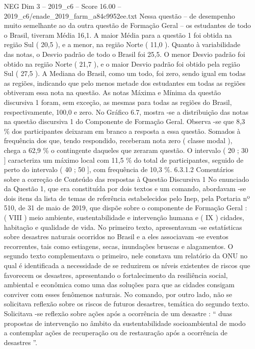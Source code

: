 \begin{textsample}{NEG Dim 3 – 2019\_c6 – Score 16.00 – 2019\_c6/enade\_2019\_farm\_a84c9952ee.txt}
Nessa questão – de desempenho muito semelhante ao da outra questão de Formação Geral – os estudantes de todo o Brasil, tiveram Média 16,1.
A maior Média para a questão 1 foi obtida na região Sul ( 20,5 ), e a menor, na região Norte ( 11,0 ).
Quanto à variabilidade das notas, o Desvio padrão de todo o Brasil foi 25,5.
O menor Desvio padrão foi obtido na região Norte ( 21,7 ), e o maior Desvio padrão foi obtido pela região Sul ( 27,5 ).
A Mediana do Brasil, como um todo, foi zero, sendo igual em todas as regiões, indicando que pelo menos metade dos estudantes em todas as regiões obtiveram essa nota na questão.
As notas Máxima e Mínima da questão discursiva 1 foram, sem exceção, as mesmas para todas as regiões do Brasil, respectivamente, 100,0 e zero.
No Gráfico 6.7, mostra -se a distribuição das notas na questão discursiva 1 do Componente de Formação Geral.
Observa -se que 8,3 \% dos participantes deixaram em branco a resposta a essa questão.
Somados à frequência dos que, tendo respondido, receberam nota zero ( classe modal ), chega a 62,9 \% o contingente daqueles que zeraram questão.
O intervalo ( 20 ; 30 ] caracteriza um máximo local com 11,5 \% do total de participantes, seguido de perto do intervalo ( 40 ; 50 ], com frequência de 10,3 \%. 6.3.1.2 Comentários sobre a correção de Conteúdo das respostas à Questão Discursiva 1 No enunciado da Questão 1, que era constituída por dois textos e um comando, abordavam -se dois itens da lista de temas de referência estabelecidos pelo Inep, pela Portaria nº 510, de 31 de maio de 2019, que dispõe sobre o componente de Formação Geral : ( VIII ) meio ambiente, sustentabilidade e intervenção humana e ( IX ) cidades, habitação e qualidade de vida.
No primeiro texto, apresentavam -se estatísticas sobre desastres naturais ocorridos no Brasil e a eles associavam -se eventos recorrentes, tais como estiagens, secas, inundações bruscas e alagamentos.
O segundo texto complementava o primeiro, nele constava um relatório da ONU no qual é identificada a necessidade de se reduzirem os níveis existentes de riscos que favorecem os desastres, apresentando o fortalecimento da resiliência social, ambiental e econômica como uma das soluções para que as cidades consigam conviver com esses fenômenos naturais.
No comando, por outro lado, não se solicitava reflexão sobre os riscos de futuros desastres, temática do segundo texto.
Solicitava -se reflexão sobre ações após a ocorrência de um desastre : “ duas propostas de intervenção no âmbito da sustentabilidade socioambiental de modo a contemplar ações de recuperação ou de restauração após a ocorrência de desastres ”.

\end{textsample}
